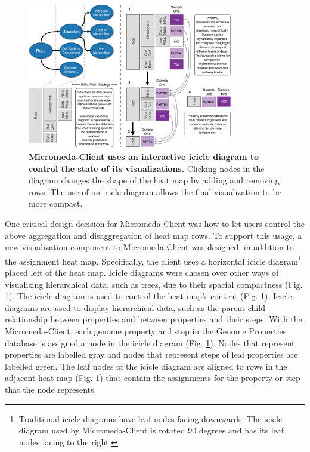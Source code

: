 \begin{figure}[!ht]
  \centering
	\includegraphics[width=0.8\textwidth]{media/visualization_design_philosphy.pdf}
	 \caption[Micromeda-Client uses an interactive icicle diagram to control the 
state of its visualizations.]{\textbf{Micromeda-Client uses an interactive 
icicle diagram to control the state of its visualizations.} Clicking nodes in 
the diagram changes the shape of the heat map by adding and removing rows. The 
use of an icicle diagram allows the final visualization to be more compact.}
	 \label{fig:visualization-philosophy}
\end{figure}

One critical design decision for Micromeda-Client was how to let users control 
the above aggregation and disaggregation of heat map rows. To support this 
usage, a new visualization component to Micromeda-Client was designed, in 
addition to the assignment heat map. Specifically, the client uses a horizontal 
icicle diagram\footnote{Traditional icicle diagrams have leaf nodes facing 
downwards. The icicle diagram used by Micromeda-Client is rotated 90 degrees and 
has its leaf nodes facing to the right.} placed left of the heat map. Icicle 
diagrams were chosen over other ways of visualizing hierarchical data, such as 
trees, due to their spacial compactness (Fig. 
\ref{fig:visualization-philosophy}). The icicle diagram is used to control the 
heat map's content (Fig. \ref{fig:visualization-philosophy}). Icicle diagrams 
are used to display hierarchical data, such as the parent-child relationship 
between properties and between properties and their steps. With the 
Micromeda-Client, each genome property and step in the Genome Properties 
database is assigned a node in the icicle diagram (Fig. 
\ref{fig:visualization-philosophy}). Nodes that represent properties are 
labelled gray and nodes that represent steps of leaf properties are labelled 
green. The leaf nodes of the icicle diagram are aligned to rows in the adjacent 
heat map (Fig. \ref{fig:visualization-philosophy}) that contain the assignments 
for the property or step that the node represents.

